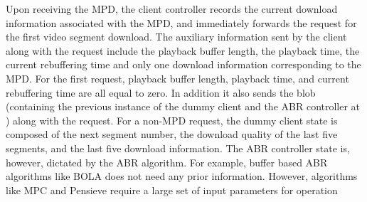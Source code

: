 \indent Upon receiving the MPD, the client controller records the current download information associated with the MPD, and immediately forwards the request for the first video segment download. The auxiliary information sent by the client along with the request include the playback buffer length, the playback time, the current rebuffering time  and only one download information corresponding to the MPD.  For the first request, playback buffer length, playback time, and current rebuffering time are all equal to zero. In addition it also sends the blob (containing the previous instance of the dummy client and the ABR controller at \servname) along with the request. For a non-MPD request, the dummy client state is composed of the next segment number, the download quality of the last five segments, and the last five download information. The \ac{ABR} controller state is, however, dictated by the \ac{ABR} algorithm. For example, buffer based \ac{ABR} algorithms like BOLA \cite{Spiteri2016} does not need any prior information. However, algorithms like MPC \cite{yin2015control} and Pensieve \cite{mao2017neural} require a large set of input parameters for operation \\

